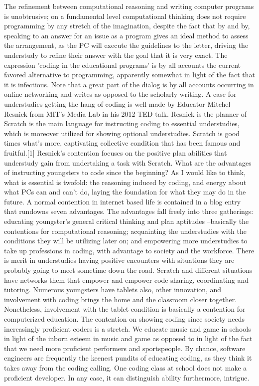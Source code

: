 The refinement between computational reasoning and writing computer programs is unobtrusive; on a fundamental level computational thinking does not require programming by any stretch of the imagination, despite the fact that by and by, speaking to an answer for an issue as a program gives an ideal method to assess the arrangement, as the PC will execute the guidelines to the letter, driving the understudy to refine their answer with the goal that it is very exact. The expression ’coding in the educational programs’ is by all accounts the current favored alternative to programming, apparently somewhat in light of the fact that it is infectious. Note that a great part of the dialog is by all accounts occurring in online networking and writes as opposed to the scholarly writing. A case for understudies getting the hang of coding is well-made by Educator Mitchel Resnick from MIT’s Media Lab in his 2012 TED talk. Resnick is the planner of Scratch is the main language for instructing coding to essential understudies, which is moreover utilized for showing optional understudies. Scratch is good times what’s more, captivating collective condition that has been famous and fruitful.[1] Resnick’s contention focuses on the positive plan abilities that understudy gain from undertaking a task with Scratch. What are the advantages of instructing youngsters to code since the beginning? As I would like to think, what is essential is twofold: the reasoning induced by coding, and energy about what PCs can and can’t do, laying the foundation for what they may do in the future. A normal contention in internet based life is contained in a blog entry that rundowns seven advantages. The advantages fall freely into three gatherings: educating youngster’s general critical thinking and plan aptitudes –basically the contentions for computational reasoning; acquainting the understudies with the conditions they will be utilizing later on; and empowering more understudies to take up professions in coding, with advantage to society and the workforce. There is merit in understudies having positive encounters with situations they are probably going to meet sometime down the road. Scratch and different situations have networks them that empower and empower code sharing, coordinating and tutoring. Numerous youngsters have tablets also, other innovation, and involvement with coding brings the home and the classroom closer together. Nonetheless, involvement with the tablet condition is basically a contention for computerized education. The contention on showing coding since society needs increasingly proficient coders is a stretch. We educate music and game in schools in light of the inborn esteem in music and game as opposed to in light of the fact that we need more proficient performers and sportspeople. By chance, software engineers are frequently the keenest pundits of educating coding, as they think it takes away from the coding calling. One coding class at school does not make a proficient developer. In any case, it can distinguish ability furthermore, intrigue.
